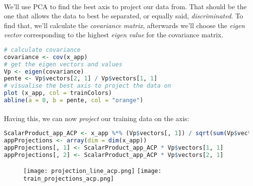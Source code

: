 \paragraph{}
We'll use PCA to find the best axis to project our data from.
That should be the one that allows the data to best be separated, or equally said, \emph{discriminated}.
To find that, we'll calculate the \emph{covariance matrix}, afterwards we'll choose the \emph{eigen vector} corresponding to the highest \emph{eigen value} for the covariance matrix.

\begin{lstlisting}[language=R, caption=Calculating the most discriminating axis]
# calculate covariance
covariance <- cov(x_app)
# get the eigen vectors and values
Vp <- eigen(covariance)
pente <- Vp$vectors[2, 1] / Vp$vectors[1, 1]
# visualise the best axis to project the data on
plot (x_app, col = trainColors)
abline(a = 0, b = pente, col = "orange")
\end{lstlisting}

\paragraph{}
Having this, we can now \emph{project} our training data on the axis:

\begin{lstlisting}[language=R, caption=Calculating the most discriminating axis]
ScalarProduct_app_ACP <- x_app %*% (Vp$vectors[, 1]) / sqrt(sum(Vp$vectors[, 1] * Vp$vectors[, 1]))
appProjections <- array(dim = dim(x_app))
appProjections[, 1] <- ScalarProduct_app_ACP * Vp$vectors[1, 1]
appProjections[, 2] <- ScalarProduct_app_ACP * Vp$vectors[2, 1]
\end{lstlisting}

\begin{figure}[!h]
    \centering
    \hspace{-1cm}%
    \texttt{[image: projection\_line\_acp.png]}
    \texttt{[image: train\_projections\_acp.png]}
    
    \begin{minipage}[t]{.5\textwidth}
    \centering
    \end{minipage}
    
    \begin{minipage}[t]{.5\textwidth}
    \centering
    \end{minipage}
\end{figure}


